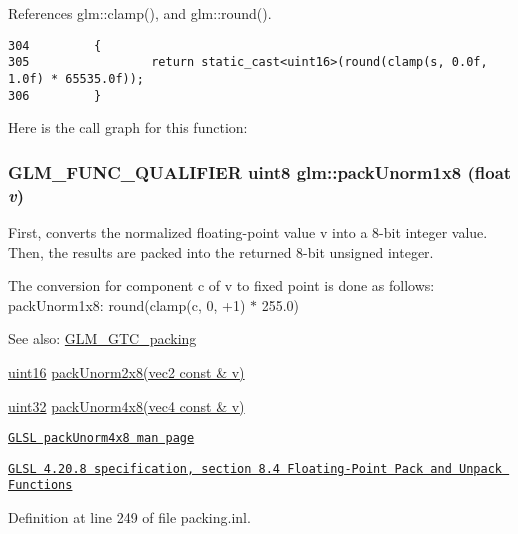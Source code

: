 References glm::clamp(), and glm::round().

\begin{Code}\begin{verbatim}304         {
305                 return static_cast<uint16>(round(clamp(s, 0.0f, 1.0f) * 65535.0f));
306         }
\end{verbatim}
\end{Code}




Here is the call graph for this function:\hypertarget{group__gtc__packing_g2f9963e5d762b10085b280d3662017ba}{
\subsubsection[packUnorm1x8]{\setlength{\rightskip}{0pt plus 5cm}GLM\_\-FUNC\_\-QUALIFIER uint8 glm::packUnorm1x8 (float {\em v})}}
\label{group__gtc__packing_g2f9963e5d762b10085b280d3662017ba}


First, converts the normalized floating-point value v into a 8-bit integer value. Then, the results are packed into the returned 8-bit unsigned integer.

The conversion for component c of v to fixed point is done as follows: packUnorm1x8: round(clamp(c, 0, +1) $\ast$ 255.0)

\begin{Desc}
\item[See also:]\hyperlink{group__gtc__packing}{GLM\_\-GTC\_\-packing} 

\hyperlink{group__gtc__type__precision_gd8c2939e1fdd8e5828b31d95c52255d5}{uint16} \hyperlink{group__gtc__packing_g833288fc0d4a79f19d0db75a6843bfe6}{packUnorm2x8(vec2 const \& v)} 

\hyperlink{group__gtc__type__precision_g202b6a53c105fcb7e531f9b443518451}{uint32} \hyperlink{group__core__func__packing_g834ee9a9e73dcb0a7c1fc88143f3edb8}{packUnorm4x8(vec4 const \& v)} 

\href{http://www.opengl.org/sdk/docs/manglsl/xhtml/packUnorm4x8.xml}{\tt GLSL packUnorm4x8 man page} 

\href{http://www.opengl.org/registry/doc/GLSLangSpec.4.20.8.pdf}{\tt GLSL 4.20.8 specification, section 8.4 Floating-Point Pack and Unpack Functions} \end{Desc}


Definition at line 249 of file packing.inl.

